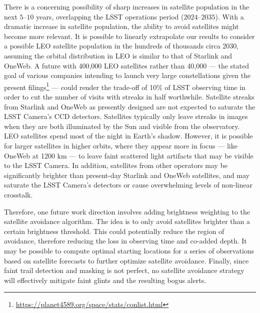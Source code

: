\documentclass[twocolumn]{aastex631}
\begin{document}
There is a concerning possibility of sharp increases in satellite population in the next $5–10$ years, overlapping the LSST operations period ($2024–2035$). With a dramatic increase in satellite population, the ability to avoid satellites might become more relevant. 
It is possible to linearly extrapolate our results to consider a possible LEO satellite population in the hundreds of thousands circa 2030, assuming the orbital distribution in LEO is similar to that of Starlink and OneWeb. A future with 400,000 LEO satellites rather than 40,000 --- the stated goal of various companies intending to launch very large constellations given the present filings\footnote{\url{https://planet4589.org/space/stats/conlist.html}} --- could  render the trade-off of 10\% of LSST observing time in order to cut the number of visits with streaks in half worthwhile. 
Satellite streaks from Starlink and OneWeb as presently designed are not expected to saturate the LSST Camera's CCD detectors. Satellites typically only leave streaks in images when they are both illuminated by the Sun and visible from the observatory. LEO satellites spend most of the night in Earth's shadow.
However, it is possible for larger satellites in higher orbits, where they appear more in focus --- like OneWeb at 1200 km --- to leave faint scattered light artifacts that may be visible to the LSST Camera. %
 In addition, satellites from other operators may be significantly brighter than present-day Starlink and OneWeb satellites, and may saturate the LSST Camera’s detectors or cause overwhelming levels of non-linear crosstalk.  
 
Therefore, one future work direction involves adding brightness weighting to the satellite avoidance algorithm. The idea is to only avoid satellites brighter than a certain brightness threshold. This could potentially reduce the region of avoidance, therefore reducing the loss in observing time and co-added depth. It may be possible to compute optimal starting locations for a series of observations based on satellite forecasts to further optimize satellite avoidance. Finally, since faint trail detection and masking is not perfect, no satellite avoidance strategy will effectively mitigate faint glints and the resulting bogus alerts.


\end{document}
